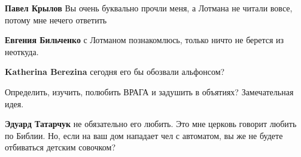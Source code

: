 \begin{itemize}
\begin{itemize}
 
\textbf{Павел Крылов} Вы очень буквально прочли меня, а Лотмана не читали вовсе, потому мне нечего ответить

 
\textbf{Евгения Бильченко}
с Лотманом познакомлюсь, только ничто не берется из неоткуда.

 
\textbf{Katherina Berezina}
сегодня его бы обозвали альфонсом?
\end{itemize}

 
Определить, изучить, полюбить ВРАГА и задушить в объятиях? Замечательная идея.

\begin{itemize}
 
\textbf{Эдуард Татарчук} не обязательно его любить. Это мне церковь говорит любить по Библии. Но, если на ваш дом нападает чел с автоматом, вы же не будете отбиваться детским совочком?

 

\end{itemize}
\end{itemize}
